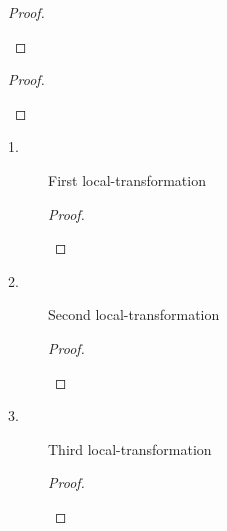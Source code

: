 \FloatInTheorem

\begin{proof}~

\begin{tabbing}

\end{tabbing}
\end{proof}


\FullLazinessTheorem

\begin{proof}~

\begin{tabbing}

\end{tabbing}
\end{proof}


\LocalTransformationsTheorem

\begin{description}
\item[1.] First local-transformation
\begin{proof}~

\begin{tabbing}

\end{tabbing}
\end{proof}

\item[2.] Second local-transformation
\begin{proof}~

\begin{tabbing}

\end{tabbing}
\end{proof}

\item[3.] Third local-transformation
\begin{proof}~

\begin{tabbing}

\end{tabbing}
\end{proof}
\end{description}




